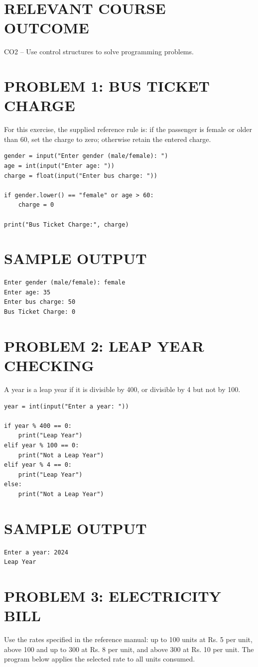 \documentclass[12pt,a4paper]{report}
\newcommand{\courseoutcome}[1]{\section*{RELEVANT COURSE OUTCOME}#1}
\newcommand{\sampleoutput}{\section*{SAMPLE OUTPUT}}
\begin{document}
\courseoutcome{CO2 -- Use control structures to solve programming problems.}

\section*{PROBLEM 1: BUS TICKET CHARGE}
For this exercise, the supplied reference rule is: if the passenger is female or older than 60, set the charge to zero; otherwise retain the entered charge.

\begin{lstlisting}
gender = input("Enter gender (male/female): ")
age = int(input("Enter age: "))
charge = float(input("Enter bus charge: "))

if gender.lower() == "female" or age > 60:
    charge = 0

print("Bus Ticket Charge:", charge)
\end{lstlisting}

\sampleoutput
\begin{verbatim}
Enter gender (male/female): female
Enter age: 35
Enter bus charge: 50
Bus Ticket Charge: 0
\end{verbatim}

\section*{PROBLEM 2: LEAP YEAR CHECKING}
A year is a leap year if it is divisible by 400, or divisible by 4 but not by 100.

\begin{lstlisting}
year = int(input("Enter a year: "))

if year % 400 == 0:
    print("Leap Year")
elif year % 100 == 0:
    print("Not a Leap Year")
elif year % 4 == 0:
    print("Leap Year")
else:
    print("Not a Leap Year")
\end{lstlisting}

\sampleoutput
\begin{verbatim}
Enter a year: 2024
Leap Year
\end{verbatim}

\section*{PROBLEM 3: ELECTRICITY BILL}
Use the rates specified in the reference manual: up to 100 units at Rs. 5 per unit, above 100 and up to 300 at Rs. 8 per unit, and above 300 at Rs. 10 per unit. The program below applies the selected rate to all units consumed.
\end{document}
